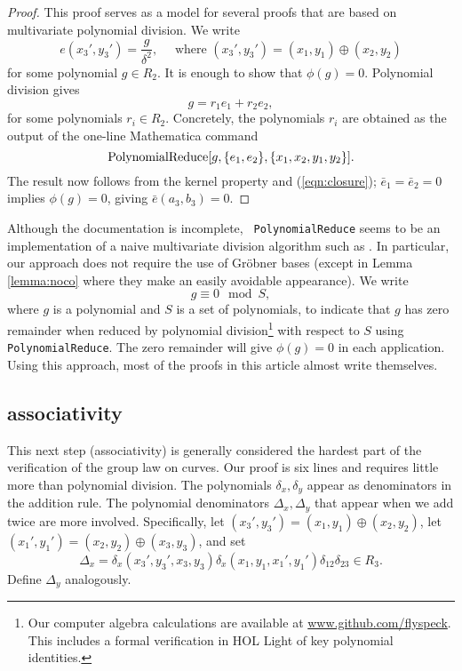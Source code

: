 \documentclass[12pt]{article}
\newcommand{\op}[1]{\hbox{#1}}
\def\cong{\equiv}
\begin{document}
\begin{proof} This proof serves as a model for several proofs that are
  based on multivariate polynomial division.  We write
\[
e(x_3',y_3') = \frac{g}{\delta^2},\quad \text{ where } 
(x_3',y_3')=(x_1,y_1) \oplus (x_2,y_2) 
\]
for some polynomial $g \in R_2$.  It is enough to show that $\phi(g)=0$.
Polynomial division gives
\begin{equation}\label{eqn:closure}
g= r_1 e_1 + r_2 e_2,
\end{equation}
for some polynomials $r_i\in R_2$.  Concretely, the polynomials $r_i$
are obtained as the output of the one-line Mathematica command
\[
\op{PolynomialReduce}[g,\{e_1,e_2\},\{x_1,x_2,y_1,y_2\}].
\]
The result now follows from the kernel
property and (\ref{eqn:closure}); $\bar e_1 = \bar e_2 = 0$ implies
$\phi(g)= 0$, giving ${\bar e}(a_3,b_3)=0$.
\end{proof}

Although the documentation is incomplete,  {\tt
  PolynomialReduce} seems to be an implementation of a naive
multivariate division algorithm such as \cite{cox1992ideals}.  In
particular, our approach does not require the use of Gr\"obner bases
(except in Lemma \ref{lemma:noco} where they make an easily avoidable
appearance).  We write
\[
g \cong 0 \mod S,
\]
where $g$ is a polynomial and $S$ is a set of polynomials, to indicate
that $g$ has zero remainder when reduced by polynomial
division\footnote{Our computer algebra calculations are available at
  \url{www.github.com/flyspeck}.  This includes a formal verification
  in HOL Light of key polynomial identities.} with respect to $S$
using {\tt PolynomialReduce}.  The zero remainder will give
$\phi(g)=0$ in each application.  Using this approach, most of the
proofs in this article almost write themselves.


\subsection{associativity}

This next step (associativity) is generally considered the hardest
part of the verification of the group law on curves.  Our proof is six lines
and requires little more than polynomial division.  The polynomials
$\delta_x,\delta_y$ appear as denominators in the addition rule.  The
polynomial denominators $\Delta_x,\Delta_y$ that appear when we add twice are
more involved.  Specifically, let $ (x_3',y_3')=(x_1,y_1) \oplus
(x_2,y_2)$, let $(x_1',y_1')=(x_2,y_2) \oplus (x_3,y_3) $, and set
\[
\Delta_x = \delta_x(x_3',y_3',x_3,y_3)
\delta_x(x_1,y_1,x_1',y_1')\delta_{12}\delta_{23}\in R_3.
\]
Define $\Delta_y$ analogously.
\end{document}
